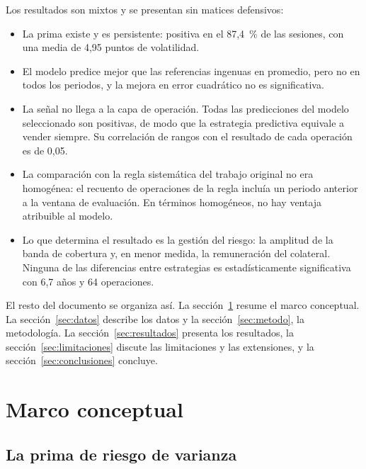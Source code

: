\documentclass[11pt,a4paper]{article}
\begin{document}
Los resultados son mixtos y se presentan sin matices defensivos:
\begin{itemize}
  \item La prima existe y es persistente: positiva en el 87,4~\% de las sesiones, con una media de 4,95 puntos de volatilidad.
  \item El modelo predice mejor que las referencias ingenuas en promedio, pero no en todos los periodos, y la mejora en error cuadrático no es significativa.
  \item La señal no llega a la capa de operación. Todas las predicciones del modelo seleccionado son positivas, de modo que la estrategia predictiva equivale a vender siempre. Su correlación de rangos con el resultado de cada operación es de 0,05.
  \item La comparación con la regla sistemática del trabajo original no era homogénea: el recuento de operaciones de la regla incluía un periodo anterior a la ventana de evaluación. En términos homogéneos, no hay ventaja atribuible al modelo.
  \item Lo que determina el resultado es la gestión del riesgo: la amplitud de la banda de cobertura y, en menor medida, la remuneración del colateral. Ninguna de las diferencias entre estrategias es estadísticamente significativa con 6,7 años y 64 operaciones.
\end{itemize}

El resto del documento se organiza así. La sección~\ref{sec:marco} resume el marco conceptual. La sección~\ref{sec:datos} describe los datos y la sección~\ref{sec:metodo}, la metodología. La sección~\ref{sec:resultados} presenta los resultados, la sección~\ref{sec:limitaciones} discute las limitaciones y las extensiones, y la sección~\ref{sec:conclusiones} concluye.

\section{Marco conceptual}\label{sec:marco}

\subsection{La prima de riesgo de varianza}
\end{document}
